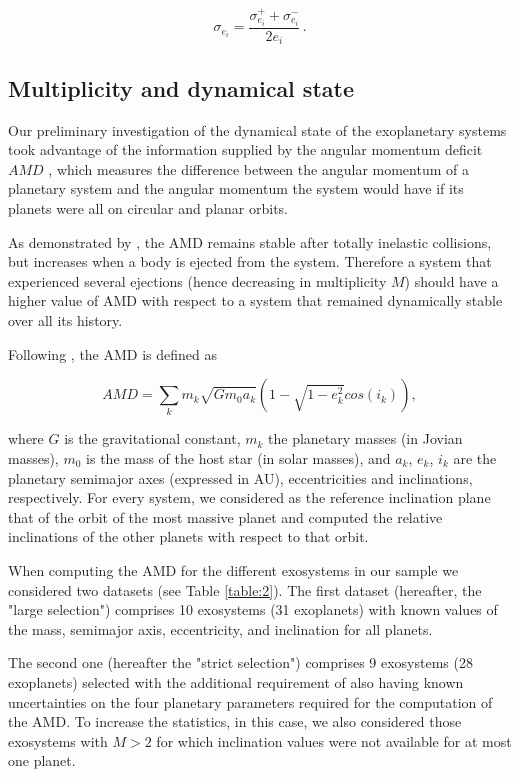 \documentclass[letter]{aa} %
\begin{document}
        \begin{equation}
        \sigma_{e_{i}} = \frac{\sigma_{e_{i}}^{+} + \sigma_{e_{i}}^{-}}{2e_{i}} \,
        .\end{equation}
        
        \subsection{Multiplicity and dynamical state}

        
Our preliminary investigation of the dynamical state of the exoplanetary systems took advantage of the information supplied by the angular momentum deficit $AMD$ \citep{AMD}, which measures the difference between the angular momentum of a planetary system and the angular momentum the system would have if its planets were all on circular and planar orbits. 

As demonstrated by \cite{AMD2017}, the AMD remains stable after totally inelastic collisions, but increases when a body is ejected from the system. Therefore a system that experienced several ejections (hence decreasing in multiplicity $M$) should have a higher value of AMD with respect to a system that remained dynamically stable over all its history.
        
Following \cite{AMD}, the AMD is defined as
        
        \begin{equation}
        AMD = \sum_{k}{m_{k}\sqrt{Gm_{0}a_{k}}\left(1-\sqrt{1-e_{k}^2}cos(i_{k})\right)}
        ,\end{equation}  
        
where $G$ is the gravitational constant, $m_{k}$ the planetary masses (in Jovian masses), $m_{0}$ is the mass of the host star (in solar masses), and $a_{k}$, $e_{k}$, $i_{k}$ are the planetary semimajor axes (expressed in AU), eccentricities and inclinations, respectively. For every system, we considered as the reference inclination plane that of the orbit of the most massive planet and computed the relative inclinations of the other planets with respect to that orbit.
        
        When computing the AMD for the different exosystems in our sample we considered two datasets (see Table \ref{table:2}). The first  dataset (hereafter, the "large selection") comprises 10 exosystems (31 exoplanets) with known values of the mass, semimajor axis, eccentricity, and inclination for all planets. 
        
        The second one (hereafter the "strict selection") comprises 9 exosystems (28 exoplanets) selected with the additional requirement of also having known uncertainties on the four planetary parameters required for the computation of the AMD. To increase the statistics, in this case, we also considered those exosystems with $M>2$ for which inclination values were not available for at most one planet. 
        
\end{document}

